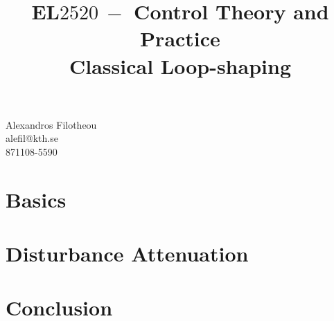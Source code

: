 \documentclass[a4paper,12pt,oneside,onecolumn]{article} %
\title{
	\vspace{3in}
  EL$2520\ -$ Control Theory and Practice \\ Classical Loop-shaping}
\begin{document}
	\maketitle
  \vfill
  \centering
  Alexandros Filotheou \\ alefil@kth.se \\ 871108-5590
  \vfill
  \abstract{}

  \newpage

  \section{Basics}
    

  \newpage

  \section{Disturbance Attenuation}
    

  \newpage

  \section{Conclusion}
    
\end{document}
